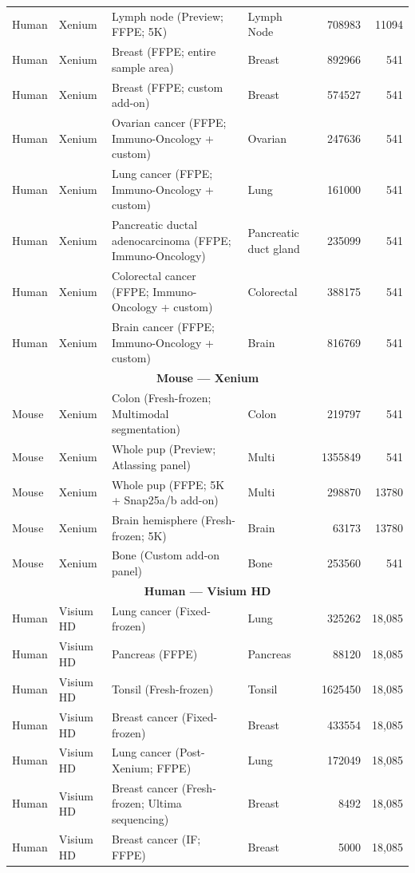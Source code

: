 \documentclass{article}
\begin{document}
\begin{table}[tb]
{\begin{tabular}{l l p{7.2cm} l r r}
Human & Xenium & Lymph node (Preview; FFPE; 5K) & Lymph Node & 708983 & 11094 \\
Human & Xenium & Breast (FFPE; entire sample area) & Breast & 892966 & 541 \\
Human & Xenium & Breast (FFPE; custom add-on) & Breast & 574527 & 541 \\
Human & Xenium & Ovarian cancer (FFPE; Immuno-Oncology + custom) & Ovarian & 247636 & 541 \\
Human & Xenium & Lung cancer (FFPE; Immuno-Oncology + custom) & Lung & 161000 & 541 \\
Human & Xenium & Pancreatic ductal adenocarcinoma (FFPE; Immuno-Oncology) & Pancreatic duct gland & 235099 & 541 \\
Human & Xenium & Colorectal cancer (FFPE; Immuno-Oncology + custom) & Colorectal & 388175 & 541 \\
Human & Xenium & Brain cancer (FFPE; Immuno-Oncology + custom) & Brain & 816769 & 541 \\
\midrule
\multicolumn{6}{c}{\textbf{Mouse — Xenium}} \\
\midrule
Mouse & Xenium & Colon (Fresh-frozen; Multimodal segmentation) & Colon & 219797 & 541 \\
Mouse & Xenium & Whole pup (Preview; Atlassing panel) & Multi & 1355849 & 541 \\
Mouse & Xenium & Whole pup (FFPE; 5K + Snap25a/b add-on) & Multi & 298870 & 13780 \\
Mouse & Xenium & Brain hemisphere (Fresh-frozen; 5K) & Brain & 63173 & 13780 \\
Mouse & Xenium & Bone (Custom add-on panel) & Bone & 253560 & 541 \\
\midrule
\multicolumn{6}{c}{\textbf{Human — Visium HD}} \\
\midrule
Human & Visium HD & Lung cancer (Fixed-frozen) & Lung & 325262 & 18{,}085 \\
Human & Visium HD & Pancreas (FFPE) & Pancreas & 88120 & 18{,}085 \\
Human & Visium HD & Tonsil (Fresh-frozen) & Tonsil & 1625450 & 18{,}085 \\
Human & Visium HD & Breast cancer (Fixed-frozen) & Breast & 433554 & 18{,}085 \\
Human & Visium HD & Lung cancer (Post-Xenium; FFPE) & Lung & 172049 & 18{,}085 \\
Human & Visium HD & Breast cancer (Fresh-frozen; Ultima sequencing) & Breast & 8492 & 18{,}085 \\
Human & Visium HD & Breast cancer (IF; FFPE) & Breast & 5000 & 18{,}085 \\

\end{tabular}}
\end{table}
\end{document}
